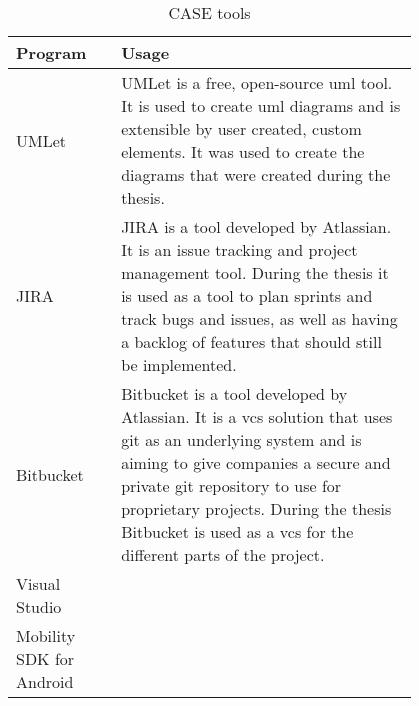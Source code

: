 \begin{table}[htbp]
	\begin{center}
	\begin{tabular}{|p{0.2\linewidth}|p{0.6\linewidth}|} \hline
	\textbf{Program} & \textbf{Usage} \\ \hline
	UMLet & UMLet is a free, open-source \gls{uml} tool. It is used to create \gls{uml} diagrams and is extensible by user created, custom elements. \citep{website:umlet} It was used to create the diagrams that were created during the thesis.  \\ \hline
	JIRA & JIRA is a tool developed by Atlassian. It is an issue tracking and project management tool. During the thesis it is used as a tool to plan sprints and track bugs and issues, as well as having a backlog of features that should still be implemented. \\ \hline
	Bitbucket & Bitbucket is a tool developed by Atlassian. It is a \gls{vcs} solution that uses git as an underlying system and is aiming to give companies a secure and private git repository to use for proprietary projects. During the thesis Bitbucket is used as a \gls{vcs} for the different parts of the project. \\ \hline
	Visual Studio & \\ \hline
	Mobility SDK for Android & \\ \hline
	\end{tabular}
	\end{center}
	\caption{CASE tools}\label{tab:case}
\end{table}